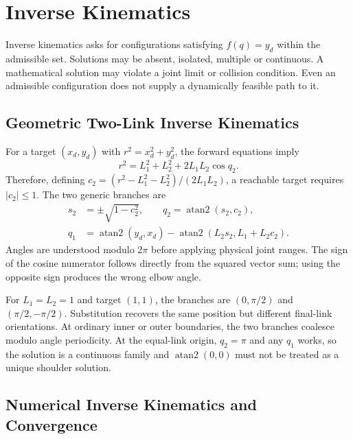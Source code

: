 \section{Inverse Kinematics}
\label{sec:inverse_kinematics}
\label{thm:newton_raphson_ik}
\label{ex:ex_2link_ik}
\label{def:ik_problem}

Inverse kinematics asks for configurations satisfying $f(q)=y_d$ within the admissible set. Solutions may be absent, isolated, multiple or continuous. A mathematical solution may violate a joint limit or collision condition. Even an admissible configuration does not supply a dynamically feasible path to it.

\subsection{Geometric Two-Link Inverse Kinematics}

For a target $(x_d,y_d)$ with $r^2=x_d^2+y_d^2$, the forward equations imply
\begin{equation}
 r^2=L_1^2+L_2^2+2L_1L_2\cos q_2.
\end{equation}
Therefore, defining $c_2=(r^2-L_1^2-L_2^2)/(2L_1L_2)$, a reachable target requires $|c_2|\le1$. The two generic branches are
\begin{equation}
 \begin{aligned}
 s_2&=\pm\sqrt{1-c_2^2},\qquad q_2=\operatorname{atan2}(s_2,c_2),\\
 q_1&=\operatorname{atan2}(y_d,x_d)
       -\operatorname{atan2}(L_2s_2,L_1+L_2c_2).
 \end{aligned}
\end{equation}
Angles are understood modulo $2\pi$ before applying physical joint ranges. The sign of the cosine numerator follows directly from the squared vector sum; using the opposite sign produces the wrong elbow angle.

For $L_1=L_2=1$ and target $(1,1)$, the branches are $(0,\pi/2)$ and $(\pi/2,-\pi/2)$. Substitution recovers the same position but different final-link orientations. At ordinary inner or outer boundaries, the two branches coalesce modulo angle periodicity. At the equal-link origin, $q_2=\pi$ and any $q_1$ works, so the solution is a continuous family and $\operatorname{atan2}(0,0)$ must not be treated as a unique shoulder solution.

\subsection{Numerical Inverse Kinematics and Convergence}

